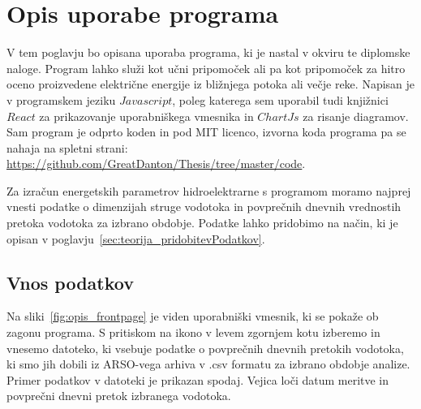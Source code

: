 \chapter{Opis uporabe programa}


V tem poglavju bo opisana uporaba programa, ki je nastal v okviru te diplomske naloge. Program lahko služi kot učni pripomoček ali pa kot pripomoček za hitro oceno proizvedene električne energije iz bližnjega potoka ali večje reke. Napisan je v programskem jeziku $Javascript$, poleg katerega sem uporabil tudi knjižnici $React$ za prikazovanje uporabniškega vmesnika in $ChartJs$ za risanje diagramov. Sam program je odprto koden in pod MIT licenco, izvorna koda programa pa se nahaja na spletni strani: \href{https://github.com/GreatDanton/Thesis/tree/master/code}{https://github.com/GreatDanton/Thesis/tree/master/code}.

Za izračun energetskih parametrov hidroelektrarne s programom moramo najprej vnesti podatke o dimenzijah struge vodotoka in povprečnih dnevnih vrednostih pretoka vodotoka za izbrano obdobje. Podatke lahko pridobimo na način, ki je opisan v poglavju~\ref{sec:teorija_pridobitevPodatkov}.




\section{Vnos podatkov}
Na sliki~\ref{fig:opis_frontpage} je viden uporabniški vmesnik, ki se pokaže ob zagonu programa. S pritiskom na ikono v levem zgornjem kotu izberemo in vnesemo datoteko, ki vsebuje podatke o povprečnih dnevnih pretokih vodotoka, ki smo jih dobili iz ARSO-vega arhiva v .csv formatu za izbrano obdobje analize. Primer podatkov v datoteki je prikazan spodaj. Vejica loči datum meritve in povprečni dnevni pretok izbranega vodotoka.

